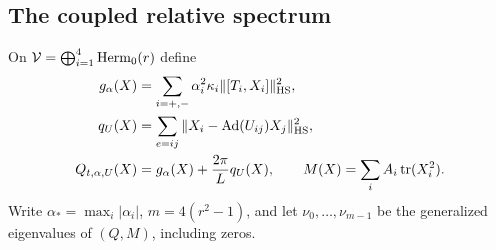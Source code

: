 \subsection{The coupled relative spectrum}
On $\mathcal V=\bigoplus_{i=1}^4\operatorname{Herm}_0(r)$ define
\begin{equation}\label{eq:coupled-form}
 \begin{split}
 g_\alpha(X)&=\sum_{i=+,-}\alpha_i^2\kappa_i
                                  \|[T_i,X_i]\|_{\mathrm{HS}}^2,\\
 q_U(X)&=\sum_{e=ij}\|X_i-\operatorname{Ad}(U_{ij})X_j\|_{\mathrm{HS}}^2,\\
 Q_{t,\alpha,U}(X)&=g_\alpha(X)+\frac{2\pi}{L}q_U(X),
 \qquad M(X)=\sum_i A_i\operatorname{tr}(X_i^2).
 \end{split}
\end{equation}
Write $\alpha_*=\max_i|\alpha_i|$,
$m=4(r^2-1)$, and let $\nu_0,\ldots,\nu_{m-1}$
be the generalized eigenvalues of $(Q,M)$,
including zeros.


